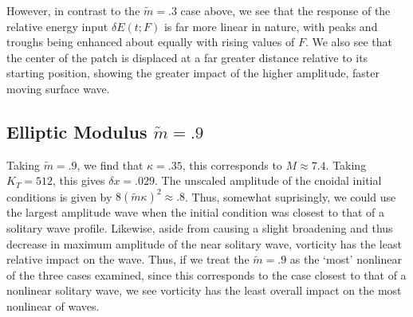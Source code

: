 \documentclass[a4paper,11pt]{article}
\begin{document}
However, in contrast to the $\tilde{m}=.3$ case above, we see that the response of the relative energy input $\delta E(t;F)$ is far more linear in nature, with peaks and troughs being enhanced about equally with rising values of $F$.  We also see that the center of the patch is displaced at a far greater distance relative to its starting position, showing the greater impact of the higher amplitude, faster moving surface wave.  
\subsection*{Elliptic Modulus $\tilde{m}=.9$}
Taking $\tilde{m}=.9$, we find that $\kappa = .35$, this corresponds to $M \approx 7.4$.  Taking $K_{T}=512$, this gives $\delta x = .029$.  The unscaled amplitude of the cnoidal initial conditions is given by $8(\tilde{m}\kappa)^{2}\approx .8$.  Thus, somewhat suprisingly, we could use the largest amplitude wave when the initial condition was closest to that of a solitary wave profile.  Likewise, aside from causing a slight broadening and thus decrease in maximum amplitude of the near solitary wave, vorticity has the least relative impact on the wave.  Thus, if we treat the $\tilde{m}=.9$ as the `most' nonlinear of the three cases examined, since this corresponds to the case closest to that of a nonlinear solitary wave, we see vorticity has the least overall impact on the most nonlinear of waves.  
\end{document}
